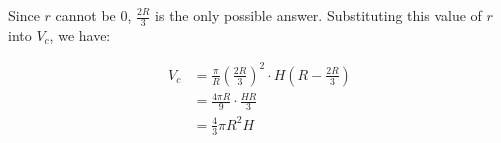 \documentclass[12pt, a4paper]{article}
\begin{document}
Since $r$ cannot be 0, $\frac{2R}{3}$ is the only possible answer.
Substituting this value of $r$ into $V_c$, we have:

\begin{align*}
    V_c & = \frac{\pi}{R}\left(\frac{2R}{3}\right)^2 \cdot H \left(R - \frac{2R}{3}\right)\\
    & = \frac{4 \pi R}{9} \cdot \frac{HR}{3}\\
    & = \frac{4}{3}\pi R^2 H
\end{align*}
\end{document}
